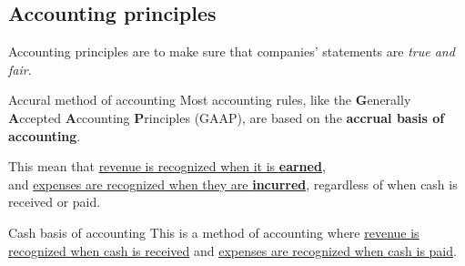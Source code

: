 \subsection{Accounting principles}
Accounting principles are to make sure that companies' statements are \textit{true and fair}.
\begin{theorem}
    {Accural method of accounting}
    Most accounting rules, like the \textbf{G}enerally \textbf{A}ccepted \textbf{A}ccounting \textbf{P}rinciples (GAAP), are based on the \textbf{accrual basis of accounting}.
    \vspace{0.5em}

    This mean that \underline{revenue is recognized when it is \textbf{earned}},\\and \underline{expenses are recognized when they are \textbf{incurred}}, regardless of when cash is received or paid.
    \label{thm:accrual_basis}
\end{theorem}
\begin{knBox}
    {Cash basis of accounting}
    This is a method of accounting where \underline{revenue is recognized when cash is received} and \underline{expenses are recognized when cash is paid}.
    \label{thm:cash_basis}
\end{knBox}

